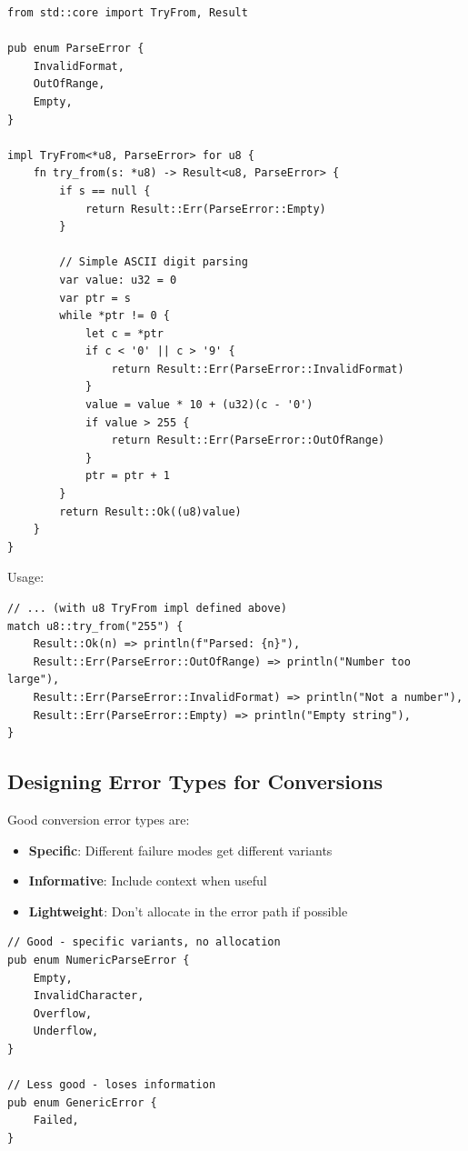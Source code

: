 \begin{lstlisting}
from std::core import TryFrom, Result

pub enum ParseError {
    InvalidFormat,
    OutOfRange,
    Empty,
}

impl TryFrom<*u8, ParseError> for u8 {
    fn try_from(s: *u8) -> Result<u8, ParseError> {
        if s == null {
            return Result::Err(ParseError::Empty)
        }

        // Simple ASCII digit parsing
        var value: u32 = 0
        var ptr = s
        while *ptr != 0 {
            let c = *ptr
            if c < '0' || c > '9' {
                return Result::Err(ParseError::InvalidFormat)
            }
            value = value * 10 + (u32)(c - '0')
            if value > 255 {
                return Result::Err(ParseError::OutOfRange)
            }
            ptr = ptr + 1
        }
        return Result::Ok((u8)value)
    }
}
\end{lstlisting}

Usage:

\begin{lstlisting}
// ... (with u8 TryFrom impl defined above)
match u8::try_from("255") {
    Result::Ok(n) => println(f"Parsed: {n}"),
    Result::Err(ParseError::OutOfRange) => println("Number too large"),
    Result::Err(ParseError::InvalidFormat) => println("Not a number"),
    Result::Err(ParseError::Empty) => println("Empty string"),
}
\end{lstlisting}

\subsection{Designing Error Types for Conversions}

Good conversion error types are:
\begin{itemize}
    \item \textbf{Specific}: Different failure modes get different variants
    \item \textbf{Informative}: Include context when useful
    \item \textbf{Lightweight}: Don't allocate in the error path if possible
\end{itemize}

\begin{lstlisting}
// Good - specific variants, no allocation
pub enum NumericParseError {
    Empty,
    InvalidCharacter,
    Overflow,
    Underflow,
}

// Less good - loses information
pub enum GenericError {
    Failed,
}
\end{lstlisting}

